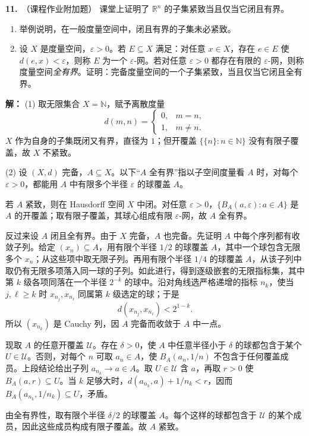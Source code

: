 \documentclass{article}
\newcommand{\R}{\mathbb R}
\newcommand{\problem}[2]{\par\medskip\noindent\textbf{#1.}\ （#2）\quad}
\begin{document}
\problem{11}{课程作业附加题}
课堂上证明了 $\R^n$ 的子集紧致当且仅当它闭且有界。
\begin{enumerate}
\item 举例说明，在一般度量空间中，闭且有界的子集未必紧致。
\item 设 $X$ 是度量空间，$\varepsilon>0$。若 $E\subseteq X$ 满足：对任意 $x\in X$，存在 $e\in E$ 使 $d(e,x)<\varepsilon$，则称 $E$ 为一个 $\varepsilon$-网。若对任意 $\varepsilon>0$ 都存在有限的 $\varepsilon$-网，则称度量空间\emph{全有界}。证明：完备度量空间的一个子集紧致，当且仅当它闭且全有界。
\end{enumerate}
\par\noindent\textbf{解：}
(1) 取无限集合 $X=\mathbb N$，赋予离散度量
\[
d(m,n)=
\begin{cases}0,&m=n,\\1,&m\ne n.\end{cases}
\]
$X$ 作为自身的子集既闭又有界，直径为 $1$；但开覆盖 $\{\{n\}:n\in\mathbb N\}$ 没有有限子覆盖，故 $X$ 不紧致。

(2) 设 $(X,d)$ 完备，$A\subseteq X$。以下“$A$ 全有界”指以子空间度量看 $A$ 时，对每个 $\varepsilon>0$，都能用 $A$ 中有限多个半径 $\varepsilon$ 的球覆盖 $A$。

若 $A$ 紧致，则在 Hausdorff 空间 $X$ 中闭。对任意 $\varepsilon>0$，$\{B_A(a,\varepsilon):a\in A\}$ 是 $A$ 的开覆盖；取有限子覆盖，其球心组成有限 $\varepsilon$-网，故 $A$ 全有界。

反过来设 $A$ 闭且全有界。由于 $X$ 完备，$A$ 也完备。先证明 $A$ 中每个序列都有收敛子列。给定 $(x_n)\subseteq A$，用有限个半径 $1/2$ 的球覆盖 $A$，其中一个球包含无限多个 $x_n$；从这些项中取无限子列。再用有限个半径 $1/4$ 的球覆盖 $A$，从该子列中取仍有无限多项落入同一球的子列。如此进行，得到逐级嵌套的无限指标集，其中第 $k$ 级各项同落在一个半径 $2^{-k}$ 的球中。沿对角线选严格递增的指标 $n_k$，使当 $j,\ell\ge k$ 时 $x_{n_j},x_{n_\ell}$ 同属第 $k$ 级选定的球；于是
\[
d(x_{n_j},x_{n_\ell})<2^{1-k}.
\]
所以 $(x_{n_k})$ 是 Cauchy 列，因 $A$ 完备而收敛于 $A$ 中一点。

现取 $A$ 的任意开覆盖 $\mathcal U$。存在 $\delta>0$，使 $A$ 中任意半径小于 $\delta$ 的球都包含于某个 $U\in\mathcal U$。否则，对每个 $n$ 可取 $a_n\in A$，使 $B_A(a_n,1/n)$ 不包含于任何覆盖成员。上段结论给出子列 $a_{n_k}\to a\in A$。取 $U\in\mathcal U$ 含 $a$，再取 $r>0$ 使 $B_A(a,r)\subseteq U$。当 $k$ 足够大时，$d(a_{n_k},a)+1/n_k<r$，因而 $B_A(a_{n_k},1/n_k)\subseteq U$，矛盾。

由全有界性，取有限个半径 $\delta/2$ 的球覆盖 $A$。每个这样的球都包含于 $\mathcal U$ 的某个成员，因此这些成员构成有限子覆盖。故 $A$ 紧致。
\end{document}
